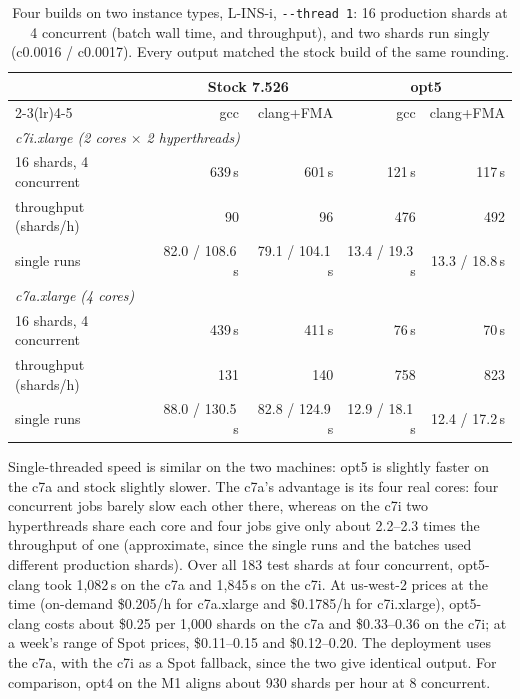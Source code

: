 \documentclass[11pt]{article}
\newcommand{\code}[1]{\texttt{#1}}
\begin{document}
\begin{table}[h]
\centering
\caption{Four builds on two instance types, L-INS-i, \code{-{}-thread 1}: 16 production
shards at 4 concurrent (batch wall time, and throughput), and two shards run singly
(c0.0016 / c0.0017). Every output matched the stock build of the same rounding.}
\label{tab:x86four}
\begin{tabular}{lrrrr}
\toprule
& \multicolumn{2}{c}{Stock 7.526} & \multicolumn{2}{c}{opt5} \\
\cmidrule(lr){2-3}\cmidrule(lr){4-5}
& gcc & clang+FMA & gcc & clang+FMA \\
\midrule
\multicolumn{5}{l}{\emph{c7i.xlarge (2 cores $\times$ 2 hyperthreads)}} \\
16 shards, 4 concurrent & 639\,s & 601\,s & 121\,s & 117\,s \\
\quad throughput (shards/h) & 90 & 96 & 476 & 492 \\
single runs & 82.0 / 108.6\,s & 79.1 / 104.1\,s & 13.4 / 19.3\,s & 13.3 / 18.8\,s \\
\midrule
\multicolumn{5}{l}{\emph{c7a.xlarge (4 cores)}} \\
16 shards, 4 concurrent & 439\,s & 411\,s & 76\,s & 70\,s \\
\quad throughput (shards/h) & 131 & 140 & 758 & 823 \\
single runs & 88.0 / 130.5\,s & 82.8 / 124.9\,s & 12.9 / 18.1\,s & 12.4 / 17.2\,s \\
\bottomrule
\end{tabular}
\end{table}

Single-threaded speed is similar on the two machines: opt5 is slightly faster on the c7a and
stock slightly slower. The c7a's advantage is its four real cores: four concurrent jobs
barely slow each other there, whereas on the c7i two hyperthreads share each core and four
jobs give only about 2.2--2.3 times the throughput of one (approximate, since the single runs
and the batches used different production shards). Over all 183 test shards at four concurrent, opt5-clang took 1{,}082\,s on the c7a and
1{,}845\,s on the c7i. At us-west-2 prices at the time (on-demand \$0.205/h for c7a.xlarge and
\$0.1785/h for c7i.xlarge), opt5-clang costs about \$0.25 per 1{,}000 shards on the c7a and
\$0.33--0.36 on the c7i; at a week's range of Spot prices, \$0.11--0.15 and \$0.12--0.20.
The deployment uses the c7a, with the c7i as a Spot fallback, since the two give identical
output. For comparison, opt4 on the M1 aligns about 930 shards per hour at 8 concurrent.
\end{document}
